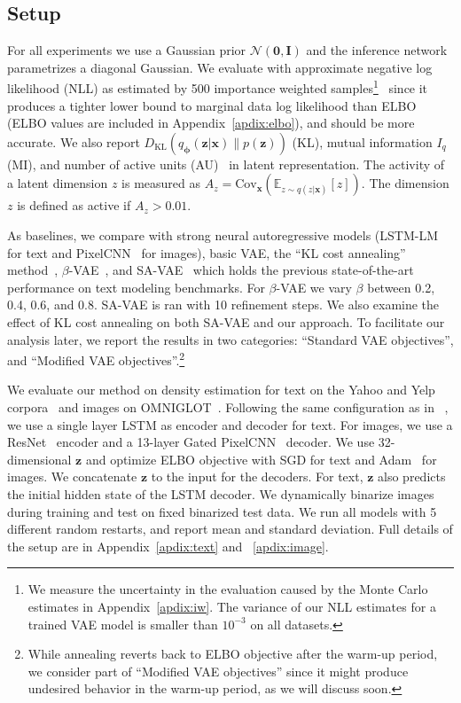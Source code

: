 \documentclass{article} \usepackage{iclr2019_conference,times}
\def\rvx{{\mathbf{x}}}
\def\rvz{{\mathbf{z}}}
\def\vphi{{\bm{\phi}}}
\newcommand{\E}{\mathbb{E}}
\newcommand{\KL}{D_{\mathrm{KL}}}
\newcommand{\qzx}{q_{\vphi}(\rvz|\rvx)}
\newcommand{\pz}{p(\rvz)}
\newcommand{\z}{\rvz}
\newcommand{\x}{\rvx}
\begin{document}
\subsection{Setup}
For all experiments we use a Gaussian prior $\mathcal{N}(\bm{0},\bm{I})$ and the inference network parametrizes a diagonal Gaussian. We evaluate with approximate negative log likelihood (NLL) as estimated by 500 importance weighted samples\footnote{We measure the uncertainty in the evaluation caused by the Monte Carlo estimates in Appendix~\ref{apdix:iw}. The variance of our NLL estimates for a trained VAE model is smaller than $10^{-3}$ on all datasets. }~\citep{burda2015importance} since it produces a tighter lower bound to marginal data log likelihood than ELBO (ELBO values are included in Appendix~\ref{apdix:elbo}), and should be more accurate. We also report $\KL(\qzx \| \pz)$ (KL), mutual information $I_q$ (MI),  and number of active units (AU)~\citep{burda2015importance} in latent representation. The activity of a latent dimension $z$ is measured as $A_{z}=\text{Cov}_{\x}(\E_{z\sim q(z|\x)}[z])$. The dimension $z$ is defined as active if $A_{z} > 0.01$.

As baselines, we compare with strong neural autoregressive models (LSTM-LM for text and PixelCNN~\citep{van2016conditional} for images), basic VAE, the ``KL cost annealing'' method~\citep{bowman2015generating,sonderby2016ladder}, $\beta$-VAE~\citep{higgins2016beta}, and SA-VAE~\citep{kim2018semi} which holds the previous state-of-the-art performance on text modeling benchmarks. For $\beta$-VAE we vary $\beta$ between 0.2, 0.4, 0.6, and 0.8. SA-VAE is ran with 10 refinement steps. We also examine the effect of KL cost annealing on both SA-VAE and our approach. To facilitate our analysis later, we report the results in two categories: ``Standard VAE objectives'', and ``Modified VAE objectives''.\footnote{While annealing reverts back to ELBO objective after the warm-up period, we consider part of ``Modified VAE objectives'' since it might produce undesired behavior in the warm-up period, as we will discuss soon.}

We evaluate our method on density estimation for text on the Yahoo and Yelp corpora~\citep{yang2017improved} and images on OMNIGLOT~\citep{lake2015human}. Following the same configuration as in ~\citet{kim2018semi}, we use a single layer LSTM as encoder and decoder for text. For images, we use a ResNet~\citep{he2016deep} encoder and a 13-layer Gated PixelCNN~\citep{van2016conditional} decoder. We use 32-dimensional $\z$ and optimize ELBO objective with SGD for text and Adam~\citep{kingma2014adam} for images. We concatenate $\z$ to the input for the decoders. For text, $\z$ also predicts the initial hidden state of the LSTM decoder. We dynamically binarize images during training and test on fixed binarized test data. We run all models with 5 different random restarts, and report mean and standard deviation. Full details of the setup are in Appendix~\ref{apdix:text} and ~\ref{apdix:image}.
\end{document}
